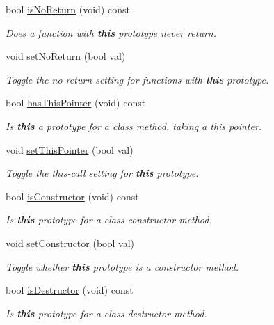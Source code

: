 \begin{DoxyCompactItemize}
bool \mbox{\hyperlink{class_func_proto_a2f1510914c66b2201248a6a06d282948}{is\+No\+Return}} (void) const
\begin{DoxyCompactList}\small\item\em Does a function with {\bfseries{this}} prototype never return. \end{DoxyCompactList}\item 
void \mbox{\hyperlink{class_func_proto_aacaf0bda9b424dfd5c6a28d3a45fb100}{set\+No\+Return}} (bool val)
\begin{DoxyCompactList}\small\item\em Toggle the {\itshape no-\/return} setting for functions with {\bfseries{this}} prototype. \end{DoxyCompactList}\item 
bool \mbox{\hyperlink{class_func_proto_a2a274b3ff58e50e73e4eaa82cb08bae3}{has\+This\+Pointer}} (void) const
\begin{DoxyCompactList}\small\item\em Is {\bfseries{this}} a prototype for a class method, taking a {\itshape this} pointer. \end{DoxyCompactList}\item 
void \mbox{\hyperlink{class_func_proto_a4b4b02b22968723dcdb23ba51955e96e}{set\+This\+Pointer}} (bool val)
\begin{DoxyCompactList}\small\item\em Toggle the {\itshape this-\/call} setting for {\bfseries{this}} prototype. \end{DoxyCompactList}\item 
bool \mbox{\hyperlink{class_func_proto_a007c1b4a9c33831738e3ac9bc283c5a4}{is\+Constructor}} (void) const
\begin{DoxyCompactList}\small\item\em Is {\bfseries{this}} prototype for a class constructor method. \end{DoxyCompactList}\item 
void \mbox{\hyperlink{class_func_proto_a1ff2f80e5cf4043147ccd83a863ee83f}{set\+Constructor}} (bool val)
\begin{DoxyCompactList}\small\item\em Toggle whether {\bfseries{this}} prototype is a {\itshape constructor} method. \end{DoxyCompactList}\item 
bool \mbox{\hyperlink{class_func_proto_aed492939de15e4ea60f9970f2ec685ac}{is\+Destructor}} (void) const
\begin{DoxyCompactList}\small\item\em Is {\bfseries{this}} prototype for a class destructor method. \end{DoxyCompactList}\item 

\end{DoxyCompactItemize}
